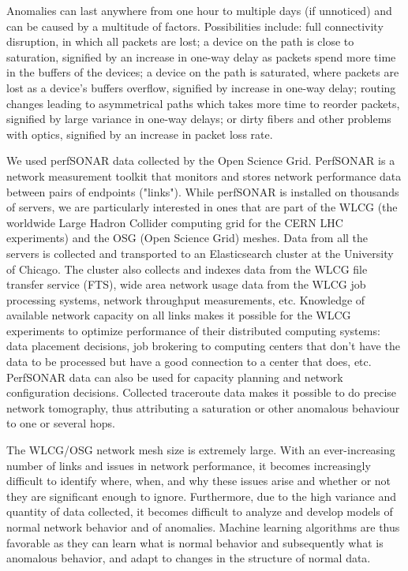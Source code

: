 \documentclass[5p]{elsarticle}
\begin{document}
Anomalies can last anywhere from one hour to multiple days (if unnoticed) and can be caused by a multitude of factors. Possibilities include: full connectivity disruption, in which all packets are lost; a device on the path is close to saturation, signified by an increase in one-way delay as packets spend more time in the buffers of the devices; a device on the path is saturated, where packets are lost as a device’s buffers overflow, signified by increase in one-way delay; routing changes leading to asymmetrical paths which takes more time to reorder packets, signified by large variance in one-way delays; or dirty fibers and other problems with optics, signified by an increase in packet loss rate.

We used perfSONAR \cite{one} data collected by the Open Science Grid. PerfSONAR is a network measurement toolkit that monitors and stores network performance data between pairs of endpoints ("links"). While perfSONAR is installed on thousands of servers, we are particularly  interested in ones that are part of the WLCG (the worldwide Large Hadron Collider computing grid for the CERN LHC experiments) and the OSG (Open Science Grid) meshes. Data from all the servers is collected and transported to an Elasticsearch cluster at the University of Chicago. The cluster also collects and indexes data from the WLCG file transfer service (FTS), wide area network usage data from the WLCG job processing systems, network throughput measurements, etc.  Knowledge of available network capacity on all links makes it possible for the WLCG experiments to optimize performance of their distributed computing systems: data placement decisions, job brokering to computing centers that don't have the data to be processed but have a good connection to a center that does, etc. PerfSONAR data can also be used for capacity planning and network configuration decisions. Collected traceroute data makes it possible to do precise network tomography, thus attributing a saturation or other anomalous behaviour to one or several hops.   

The WLCG/OSG network mesh size is extremely large. With an ever-increasing number of links and issues in network performance, it becomes increasingly difficult to identify where, when, and why these issues arise and whether or not they are significant enough to ignore. Furthermore, due to the high variance and quantity of data collected, it becomes difficult to analyze and develop models of normal network behavior and of anomalies. Machine learning algorithms are thus favorable as they can learn what is normal behavior and subsequently what is anomalous behavior, and adapt to changes in the structure of normal data.
\end{document}

